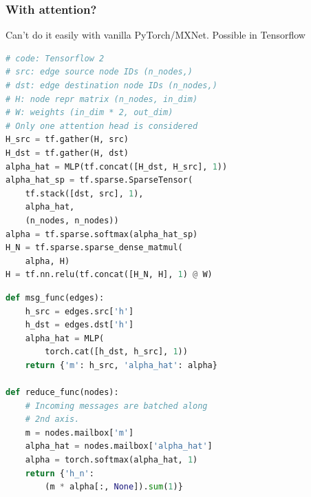 \documentclass[10pt,aspectratio=169]{beamer}
\begin{document}
	\begin{frame}[fragile]
		\frametitle{With attention?}
		Can't do it easily with vanilla PyTorch/MXNet.  Possible in Tensorflow
		\begin{minipage}{0.5\textwidth}
\begin{lstlisting}[language=Python]
# code: Tensorflow 2
# src: edge source node IDs (n_nodes,)
# dst: edge destination node IDs (n_nodes,)
# H: node repr matrix (n_nodes, in_dim)
# W: weights (in_dim * 2, out_dim)
# Only one attention head is considered
H_src = tf.gather(H, src)
H_dst = tf.gather(H, dst)
alpha_hat = MLP(tf.concat([H_dst, H_src], 1))
alpha_hat_sp = tf.sparse.SparseTensor(
    tf.stack([dst, src], 1),
    alpha_hat,
    (n_nodes, n_nodes))
alpha = tf.sparse.softmax(alpha_hat_sp)
H_N = tf.sparse.sparse_dense_matmul(
    alpha, H)
H = tf.nn.relu(tf.concat([H_N, H], 1) @ W)
\end{lstlisting}
		\end{minipage}%
		\begin{minipage}{0.5\textwidth}
\begin{lstlisting}[language=Python]
def msg_func(edges):
    h_src = edges.src['h']
    h_dst = edges.dst['h']
    alpha_hat = MLP(
        torch.cat([h_dst, h_src], 1))
    return {'m': h_src, 'alpha_hat': alpha}

def reduce_func(nodes):
    # Incoming messages are batched along
    # 2nd axis.
    m = nodes.mailbox['m']
    alpha_hat = nodes.mailbox['alpha_hat']
    alpha = torch.softmax(alpha_hat, 1)
    return {'h_n':
        (m * alpha[:, None]).sum(1)}
\end{lstlisting}
		\end{minipage}
	\end{frame}
\end{document}
